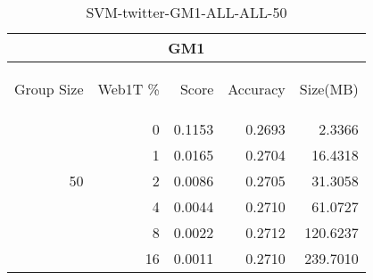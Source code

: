 \begin{center}
\begin{table}[htbp] 
 \begin{center}
\begin{tabular}{ | r | r | r | r | r |}
\hline
\multicolumn{5}{|c|}{GM1}\\
\hline
\begin{sideways}Group Size\end{sideways} & \begin{sideways}Web1T \%\end{sideways} & \begin{sideways}Score\end{sideways} & \begin{sideways}Accuracy\end{sideways} & \begin{sideways}Size(MB)\end{sideways}\\
\hline
\multirow{5}{*}{50}
 & 0 & 0.1153 & 0.2693 & 2.3366\\ \cline{2-5}
 & 1 & 0.0165 & 0.2704 & 16.4318\\ \cline{2-5}
 & 2 & 0.0086 & 0.2705 & 31.3058\\ \cline{2-5}
 & 4 & 0.0044 & 0.2710 & 61.0727\\ \cline{2-5}
 & 8 & 0.0022 & 0.2712 & 120.6237\\ \cline{2-5}
 & 16 & 0.0011 & 0.2710 & 239.7010\\ \cline{2-5}
\hline
\end{tabular}
\caption{SVM-twitter-GM1-ALL-ALL-50}
\label{table:SVM-twitter-GM1-ALL-ALL-50}
\end{center}
 \end{table}
\end{center}

